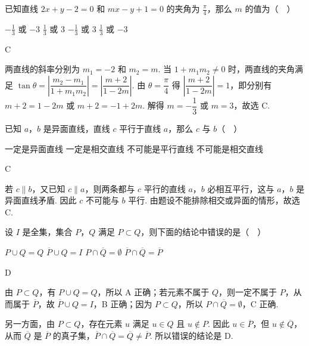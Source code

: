 \documentclass[UTF8,a4paper,oneside,11pt]{ctexbook}
\begin{document}
\begin{problem}
已知直线 \(2x + y - 2 = 0\) 和 \(mx - y + 1 = 0\) 的夹角为 \(\frac{\pi}{4}\)，那么 \(m\) 的值为（\(\quad\)）

\choices
    {\(-\frac{1}{3}\) 或 \(-3\)}
    {\(\frac{1}{3}\) 或 \(3\)}
    {\(-\frac{1}{3}\) 或 \(3\)}
    {\(\frac{1}{3}\) 或 \(-3\)}
\end{problem}

\begin{answer}
C
\end{answer}

\begin{solution}
两直线的斜率分别为 \(m_1=-2\) 和 \(m_2=m\). 当 \(1+m_1m_2\ne0\) 时，两直线的夹角满足
\(\tan\theta=\left|\dfrac{m_2-m_1}{1+m_1m_2}\right|=\left|\dfrac{m+2}{1-2m}\right|\). 由 \(\theta=\dfrac\pi4\) 得
\(\left|\dfrac{m+2}{1-2m}\right|=1\)，即分别有
\(m+2=1-2m\) 或 \(m+2=-1+2m\). 解得 \(m=-\dfrac13\) 或 \(m=3\)，故选 C.
\end{solution}

\begin{problem}
已知 \(a\)，\(b\) 是异面直线，直线 \(c\) 平行于直线 \(a\)，那么 \(c\) 与 \(b\)（\(\quad\)）

\choices
    {一定是异面直线}
    {一定是相交直线}
    {不可能是平行直线}
    {不可能是相交直线}
\end{problem}

\begin{answer}
C
\end{answer}

\begin{solution}
若 \(c\parallel b\)，又已知 \(c\parallel a\)，则两条都与 \(c\) 平行的直线 \(a\)，\(b\) 必相互平行，这与 \(a\)，\(b\) 是异面直线矛盾. 因此 \(c\) 不可能与 \(b\) 平行. 由题设不能排除相交或异面的情形，故选 C.
\end{solution}

\begin{problem}
设 \(I\) 是全集，集合 \(P\)，\(Q\) 满足 \(P \subset Q\)，则下面的结论中错误的是（\(\quad\)）

\choices
    {\(P \cup Q = Q\)}
    {\(\overline{P} \cup Q = I\)}
    {\(P \cap \overline{Q} = \emptyset\)}
    {\(\overline{P} \cap \overline{Q} = \overline{P}\)}
\end{problem}

\begin{answer}
D
\end{answer}

\begin{solution}
由 \(P\subset Q\)，有 \(P\cup Q=Q\)，所以 A 正确；若元素不属于 \(Q\)，则一定不属于 \(P\)，从而属于 \(\overline P\)，故 \(\overline P\cup Q=I\)，B 正确；因为 \(P\subset Q\)，所以 \(P\cap\overline Q=\emptyset\)，C 正确.

另一方面，由 \(P\subset Q\)，存在元素 \(u\) 满足 \(u\in Q\) 且 \(u\notin P\). 因此 \(u\in\overline P\)，但 \(u\notin\overline Q\)，从而 \(\overline Q\) 是 \(\overline P\) 的真子集，\(\overline P\cap\overline Q=\overline Q\ne\overline P\). 所以错误的结论是 D.
\end{solution}
\end{document}
